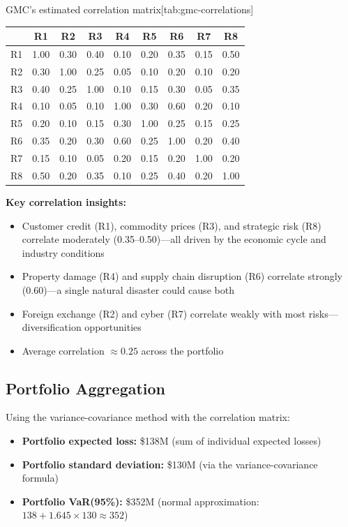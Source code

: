 \documentclass[11pt,openany]{book}
\providecommand{\tightlist}{\setlength{\itemsep}{0pt}\setlength{\parskip}{0pt}}
\begin{document}
\begin{ermtable}{GMC's estimated correlation matrix}[tab:gmc-correlations]
\begin{tabular}{@{}lcccccccc@{}}
\toprule
 & \textbf{R1} & \textbf{R2} & \textbf{R3} & \textbf{R4} & \textbf{R5} &
\textbf{R6} & \textbf{R7} & \textbf{R8} \\
\midrule
R1 & 1.00 & 0.30 & 0.40 & 0.10 & 0.20 & 0.35 & 0.15 & 0.50 \\
R2 & 0.30 & 1.00 & 0.25 & 0.05 & 0.10 & 0.20 & 0.10 & 0.20 \\
R3 & 0.40 & 0.25 & 1.00 & 0.10 & 0.15 & 0.30 & 0.05 & 0.35 \\
R4 & 0.10 & 0.05 & 0.10 & 1.00 & 0.30 & 0.60 & 0.20 & 0.10 \\
R5 & 0.20 & 0.10 & 0.15 & 0.30 & 1.00 & 0.25 & 0.15 & 0.25 \\
R6 & 0.35 & 0.20 & 0.30 & 0.60 & 0.25 & 1.00 & 0.20 & 0.40 \\
R7 & 0.15 & 0.10 & 0.05 & 0.20 & 0.15 & 0.20 & 1.00 & 0.20 \\
R8 & 0.50 & 0.20 & 0.35 & 0.10 & 0.25 & 0.40 & 0.20 & 1.00 \\
\bottomrule
\end{tabular}
\end{ermtable}

\textbf{Key correlation insights:}
\begin{itemize}\tightlist
  \item Customer credit (R1), commodity prices (R3), and strategic risk (R8)
        correlate moderately (0.35--0.50)---all driven by the economic cycle
        and industry conditions
  \item Property damage (R4) and supply chain disruption (R6) correlate
        strongly (0.60)---a single natural disaster could cause both
  \item Foreign exchange (R2) and cyber (R7) correlate weakly with most
        risks---diversification opportunities
  \item Average correlation \(\approx 0.25\) across the portfolio
\end{itemize}

\subsection{Portfolio Aggregation}
\label{subsec:gmc-aggregation}

Using the variance-covariance method with the correlation matrix:

\begin{itemize}\tightlist
  \item \textbf{Portfolio expected loss:} \$138M (sum of individual expected
        losses)
  \item \textbf{Portfolio standard deviation:} \$130M (via the
        variance-covariance formula)
  \item \textbf{Portfolio VaR(95\%):} \$352M (normal approximation:
        \(138 + 1.645 \times 130 \approx 352\))
\end{itemize}
\end{document}
